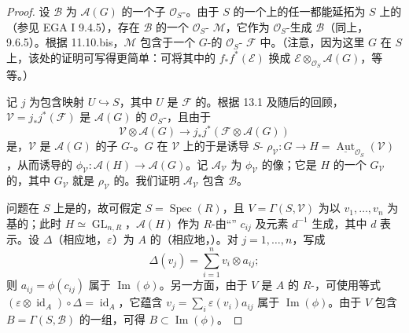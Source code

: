 \begin{proof}
设 $\mathcal B$ 为 $\mathscr A(G)$ 的一个子 $\mathcal O_S$-。由于 $S$ 的一个上的任一都能延拓为 $S$ 上的（参见 EGA I 9.4.5），存在 $\mathcal B$ 的一个 $\mathcal O_S$- $\mathcal M$，它作为 $\mathcal O_S$-生成 $\mathcal B$（同上，9.6.5）。根据 11.10.bis，$\mathcal M$ 包含于一个 $G$-的 $\mathcal O_S$- $\mathcal F$ 中。（注意，因为这里 $G$ 在 $S$ 上，该处的证明可写得更简单：可将其中的 $f_*f^*(\mathcal E)$ 换成 $\mathcal E\otimes_{\mathcal O_S}\mathscr A(G)$，等等。）

记 $j$ 为包含映射 $U\hookrightarrow S$，其中 $U$ 是 $\mathcal F$ 的。根据 13.1 及随后的回顾，$\mathcal V=j_*j^*(\mathcal F)$ 是 $\mathscr A(G)$ 的 $\mathcal O_S$-，且由于
\[
\mathcal V\otimes\mathscr A(G)\longrightarrow j_*j^*(\mathcal F\otimes\mathscr A(G))
\]
是，$\mathcal V$ 是 $\mathscr A(G)$ 的子 $G$-。$G$ 在 $\mathcal V$ 上的于是诱导 $S$- $\rho_{\mathcal V}:G\to H=\underline{\operatorname{Aut}}_{\mathcal O_S}(\mathcal V)$，从而诱导的 $\phi_{\mathcal V}:\mathscr A(H)\to\mathscr A(G)$。记 $\mathcal A_{\mathcal V}$ 为 $\phi_{\mathcal V}$ 的像；它是 $H$ 的一个 $G_{\mathcal V}$ 的，其中 $G_{\mathcal V}$ 就是 $\rho_{\mathcal V}$ 的。我们证明 $\mathcal A_{\mathcal V}$ 包含 $\mathcal B$。

问题在 $S$ 上是的，故可假定 $S=\operatorname{Spec}(R)$，且 $V=\Gamma(S,\mathcal V)$ 为以 $v_1,\ldots,v_n$ 为基的；此时 $H\simeq\operatorname{GL}_{n,R}$，$\mathscr A(H)$ 作为 $R$-由“” $c_{ij}$ 及元素 $d^{-1}$ 生成，其中 $d$ 表示。设 $\Delta$（相应地，$\varepsilon$）为 $A$ 的（相应地，）。对 $j=1,\ldots,n$，写成
\[
\Delta(v_j)=\sum_{i=1}^n v_i\otimes a_{ij};
\]
则 $a_{ij}=\phi(c_{ij})$ 属于 $\operatorname{Im}(\phi)$。另一方面，由于 $V$ 是 $A$ 的 $R$-，可使用等式 $(\varepsilon\otimes\operatorname{id}_A)\circ\Delta=\operatorname{id}_A$，它蕴含 $v_j=\sum_i\varepsilon(v_i)a_{ij}$ 属于 $\operatorname{Im}(\phi)$。由于 $V$ 包含 $B=\Gamma(S,\mathcal B)$ 的一组，可得 $B\subset\operatorname{Im}(\phi)$。


\end{proof}
